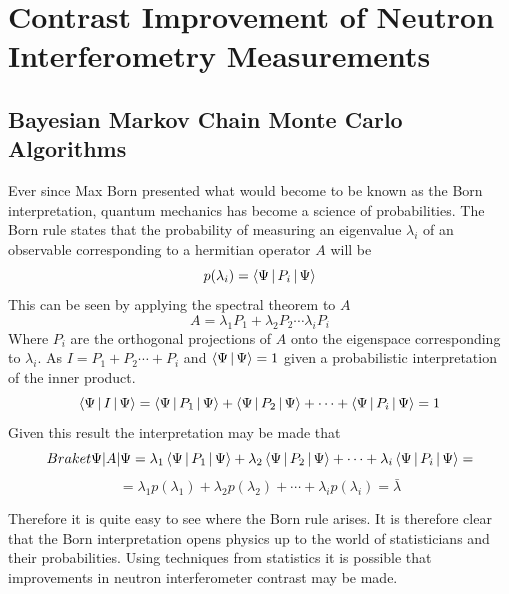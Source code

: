 \chapter{Contrast Improvement of Neutron Interferometry Measurements} %
\label{Chapter3}

\section{Bayesian Markov Chain Monte Carlo Algorithms}
Ever since Max Born presented what would become to be known as the Born interpretation, quantum mechanics has become a science of probabilities. The Born rule states that the probability of measuring an eigenvalue $\lambda_i$  of an observable corresponding to a hermitian operator $A$  will be 
\begin{equation}
p(\lambda_i) = \Braket{\Psi|P_i|\Psi}
\label{eq:bornrule}
\end{equation}
This can be seen by applying the spectral theorem to $A$\cite{linear}
\begin{equation}
A = \lambda_1 P_1 + \lambda_2 P_2 \cdots \lambda_i P_i
\end{equation}
Where $P_i$ are the orthogonal projections of $A$ onto the eigenspace corresponding to $\lambda_i$. As $I = P_1 + P_2 \cdots + P_i$ and $\Braket{\Psi|\Psi} = 1$ given a probabilistic interpretation of the inner product. 
\begin{equation}
\Braket{\Psi|I|\Psi} =\Braket{\Psi|P_1|\Psi} + \Braket{\Psi|P_2|\Psi} + \cdots +\Braket{\Psi|P_i|\Psi}  = 1
\end{equation}
Given this result the interpretation may be made that
$$Braket{\Psi|A|\Psi} = \lambda_1 \Braket{\Psi|P_1|\Psi} + \lambda_2\Braket{\Psi|P_2|\Psi} + \cdots +\lambda_i\Braket{\Psi|P_i|\Psi} =$$
\begin{equation}
=\lambda_1 p(\lambda_1) + \lambda_2p(\lambda_2) + \cdots +\lambda_ip(\lambda_i) = \bar{\lambda} 
\label{eq:quantumExpectation}
\end{equation}

Therefore it is quite easy to see where the Born rule arises. It is therefore clear that the Born interpretation opens physics up to the world of statisticians and their probabilities. Using techniques from statistics it is possible that improvements in neutron interferometer contrast may be made. 
